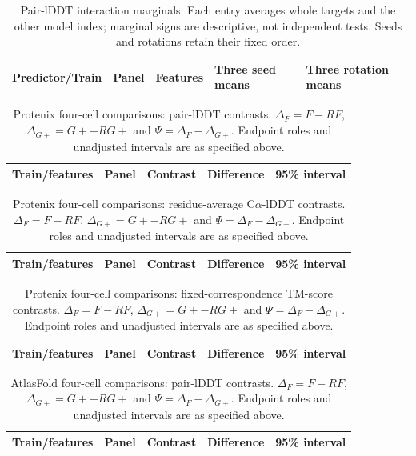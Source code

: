 \begin{table}[htbp]\centering\scriptsize
\caption{Pair-lDDT interaction marginals. Each entry averages whole targets and
the other model index; marginal signs are descriptive, not independent tests.
Seeds and rotations retain their fixed order.}
\begin{tabular}{lllll}\toprule
Predictor/Train & Panel & Features & Three seed means & Three rotation means \\\midrule

\end{tabular}\end{table}
\begin{table}[htbp]\centering\footnotesize
\caption{Protenix four-cell comparisons: pair-lDDT contrasts.
$\Delta_F=F-RF$, $\Delta_{G+}=G+-RG+$ and $\Psi=\Delta_F-\Delta_{G+}$.
Endpoint roles and unadjusted intervals are as specified above.}
\begin{tabular}{lllrr}\toprule
Train/features & Panel & Contrast & Difference & 95\% interval \\\midrule

\end{tabular}\end{table}
\begin{table}[htbp]\centering\footnotesize
\caption{Protenix four-cell comparisons: residue-average C$\alpha$-lDDT contrasts.
$\Delta_F=F-RF$, $\Delta_{G+}=G+-RG+$ and $\Psi=\Delta_F-\Delta_{G+}$.
Endpoint roles and unadjusted intervals are as specified above.}
\begin{tabular}{lllrr}\toprule
Train/features & Panel & Contrast & Difference & 95\% interval \\\midrule

\end{tabular}\end{table}
\begin{table}[htbp]\centering\footnotesize
\caption{Protenix four-cell comparisons: fixed-correspondence TM-score contrasts.
$\Delta_F=F-RF$, $\Delta_{G+}=G+-RG+$ and $\Psi=\Delta_F-\Delta_{G+}$.
Endpoint roles and unadjusted intervals are as specified above.}
\begin{tabular}{lllrr}\toprule
Train/features & Panel & Contrast & Difference & 95\% interval \\\midrule

\end{tabular}\end{table}
\begin{table}[htbp]\centering\footnotesize
\caption{AtlasFold four-cell comparisons: pair-lDDT contrasts.
$\Delta_F=F-RF$, $\Delta_{G+}=G+-RG+$ and $\Psi=\Delta_F-\Delta_{G+}$.
Endpoint roles and unadjusted intervals are as specified above.}
\begin{tabular}{lllrr}\toprule
Train/features & Panel & Contrast & Difference & 95\% interval \\\midrule

\end{tabular}\end{table}

